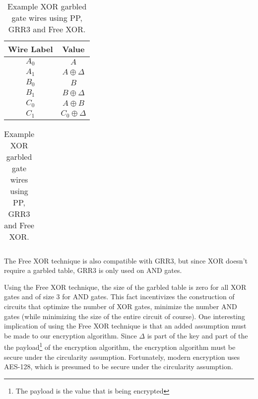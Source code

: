 \begin{table}[h]
    \centering
    \begin{tabular}{|c|c|}
        \hline
        Wire Label & Value\\
        \hline
        $A_0$ & $A$ \\
        $A_1$ & $A \oplus \Delta$ \\
        $B_0$ & $B$ \\
        $B_1$ & $B \oplus \Delta$ \\
        $C_0$ & $A \oplus B$ \\
        $C_1$ & $C_0 \oplus \Delta$ \\
        \hline
    \end{tabular}
    \qquad
    \begin{tabular}{|c|}
        \hline
        \hline
    \end{tabular}
    \caption{Example XOR garbled gate wires using PP, GRR3 and Free XOR.}
\end{table}

The Free XOR technique is also compatible with GRR3, but since XOR doesn't require a garbled table, GRR3 is only used on AND gates.

Using the Free XOR technique, the size of the garbled table is zero for all XOR gates and of size $3$ for AND gates.
This fact incentivizes the construction of circuits that optimize the number of XOR gates, minimize the number AND gates (while minimizing the size of the entire circuit of course).
One interesting implication of using the Free XOR technique is that an added assumption must be made to our encryption algorithm.
Since $\Delta$ is part of the key and part of the the payload\footnote{The payload is the value that is being encrypted} of the encryption algorithm, the encryption algorithm must be secure under the circularity assumption.
Fortunately, modern encryption uses AES-128, which is presumed to be secure under the circularity assumption.


